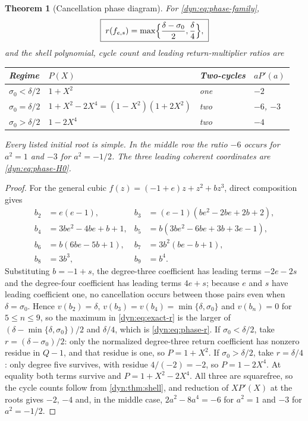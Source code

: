 \documentclass[11pt,letterpaper]{article}
\newtheorem{theorem}{Theorem}[section]
\theoremstyle{definition}
\theoremstyle{remark}
\numberwithin{equation}{section}
\begin{document}
\begin{theorem}[Cancellation phase diagram]\label{dyn:thm:phase}
For \eqref{dyn:eq:phase-family},
\begin{equation}\label{dyn:eq:phase-r}
 \boxed{\;r(f_{e,s})=\max\Bigl\{\frac{\delta-\sigma_0}{2},\frac{\delta}{4}\Bigr\},\;}
\end{equation}
and the shell polynomial, cycle count and leading return-multiplier ratios
are
\begin{center}
\small
\begin{tabular}{@{}llll@{}}
\toprule
Regime & $P(X)$ & Two-cycles & $aP'(a)$\\
\midrule
$\sigma_0<\delta/2$ & $1+X^{2}$ & one & $-2$\\
$\sigma_0=\delta/2$ & $1+X^{2}-2X^{4}=(1-X^{2})(1+2X^{2})$ & two & $-6$, $-3$\\
$\sigma_0>\delta/2$ & $1-2X^{4}$ & two & $-4$\\
\bottomrule
\end{tabular}
\end{center}
Every listed initial root is simple. In the middle row the ratio $-6$
occurs for $a^{2}=1$ and $-3$ for $a^{2}=-1/2$. The three leading coherent
coordinates are \eqref{dyn:eq:phase-H0}.
\end{theorem}
\begin{proof}
For the general cubic $f(z)=(-1+e)z+z^{2}+bz^{3}$, direct composition gives
\begin{align}
 b_2&=e(e-1), & b_3&=(e-1)(be^{2}-2be+2b+2),\nonumber\\
 b_4&=3be^{2}-4be+b+1, & b_5&=b(3be^{2}-6be+3b+3e-1),\label{dyn:eq:general-cubic}\\
 b_6&=b(6be-5b+1), & b_7&=3b^{2}(be-b+1),\nonumber\\
 b_8&=3b^{3}, & b_9&=b^{4}.\nonumber
\end{align}
Substituting $b=-1+s$, the degree-three coefficient has leading terms
$-2e-2s$ and the degree-four coefficient has leading terms $4e+s$; because
$e$ and $s$ have leading coefficient one, no cancellation occurs between
those pairs even when $\delta=\sigma_0$. Hence $v(b_2)=\delta$,
$v(b_3)=v(b_4)=\min\{\delta,\sigma_0\}$ and $v(b_n)=0$ for
$5\le n\le9$, so the maximum in \eqref{dyn:eq:exact-r} is the larger of
$(\delta-\min\{\delta,\sigma_0\})/2$ and $\delta/4$, which is
\eqref{dyn:eq:phase-r}. If $\sigma_0<\delta/2$, take
$r=(\delta-\sigma_0)/2$: only the normalized degree-three return
coefficient has nonzero residue in $Q-1$, and that residue is one, so
$P=1+X^{2}$. If $\sigma_0>\delta/2$, take $r=\delta/4$: only degree five
survives, with residue $4/(-2)=-2$, so $P=1-2X^{4}$. At equality both terms
survive and $P=1+X^{2}-2X^{4}$. All three are squarefree, so the cycle
counts follow from \cref{dyn:thm:shell}, and reduction of $XP'(X)$ at the
roots gives $-2$, $-4$ and, in the middle case,
$2a^{2}-8a^{4}=-6$ for $a^{2}=1$ and $-3$ for $a^{2}=-1/2$.
\end{proof}
\end{document}
